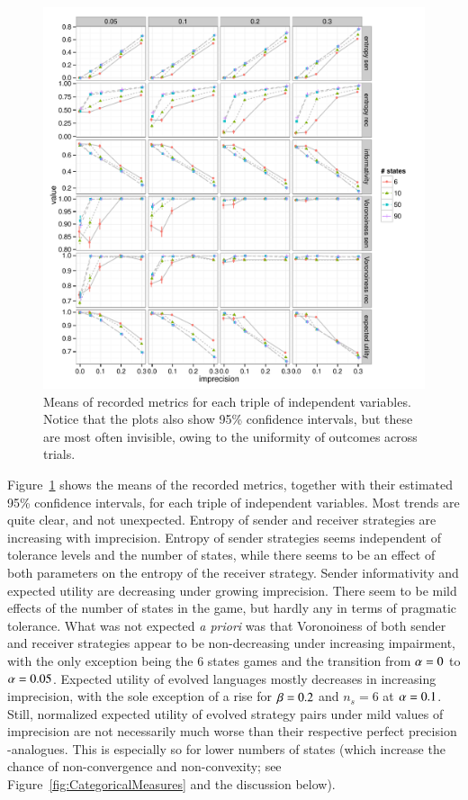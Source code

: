 \begin{figure}
  \centering
  
  \includegraphics[width=\textwidth]{plots/MeanMetrics.pdf}

  \caption{Means of recorded metrics for each triple of independent
    variables. Notice that the plots also show 95\% confidence
    intervals, but these are most often invisible, owing to the
    uniformity of outcomes across trials.}
  \label{fig:MeanMetrics}
\end{figure}

Figure~\ref{fig:MeanMetrics} shows the means of the recorded metrics,
together with their estimated 95\% confidence intervals, for each
triple of independent variables. Most trends are quite clear, and not
unexpected. Entropy of sender and receiver strategies are increasing
with imprecision. Entropy of sender strategies seems independent of
tolerance levels and the number of states, while there seems to be an
effect of both parameters on the entropy of the receiver
strategy. Sender informativity and expected utility are decreasing
under growing imprecision. There seem to be mild effects of the number
of states in the game, but hardly any in terms of pragmatic
tolerance. What was not expected \emph{a priori} was that Voronoiness
of both sender and receiver strategies appear to be non-decreasing
under increasing impairment, with the only exception being the 6 states
games and the transition from $\alpha = 0$ to $\alpha =
0.05$. Expected utility of evolved languages mostly decreases in
increasing imprecision, with the sole exception of a rise for $\beta
= 0.2$ and $n_s = 6$ at $\alpha = 0.1$. Still, normalized expected
utility of evolved strategy pairs under mild values of imprecision are
not necessarily much worse than their respective perfect precision
\rd-analogues. This is especially so for lower numbers of states
(which increase the chance of non-convergence and non-convexity; see
Figure~\ref{fig:CategoricalMeasures} and the discussion below).

